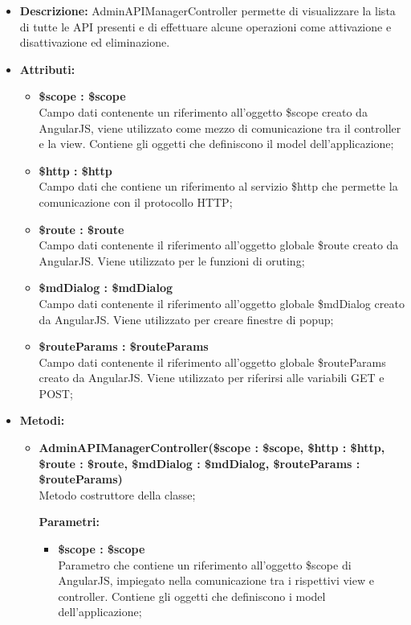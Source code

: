\begin{itemize}
	\item \textbf{Descrizione:} AdminAPIManagerController permette di visualizzare la lista di tutte le API presenti e di effettuare alcune operazioni come attivazione e disattivazione ed eliminazione.
	\item \textbf{Attributi:}
	\begin{itemize}
		
		\item \textbf{\$scope : \$scope}\\
		Campo dati contenente un riferimento all'oggetto \$scope creato da AngularJS, viene utilizzato come mezzo di comunicazione tra il controller e la view. Contiene gli oggetti che definiscono il model dell'applicazione;
		
		\item \textbf{\$http : \$http }\\
		Campo dati che contiene un riferimento al servizio \$http che permette la comunicazione con il protocollo HTTP;
		
		\item \textbf{\$route : \$route }\\
		Campo dati contenente il riferimento all'oggetto globale \$route creato da AngularJS. Viene utilizzato per le funzioni di oruting;
		
		\item \textbf{\$mdDialog : \$mdDialog }\\
		Campo dati contenente il riferimento all'oggetto globale \$mdDialog creato da AngularJS. Viene utilizzato per creare finestre di popup;
		
		\item \textbf{\$routeParams : \$routeParams }\\
		Campo dati contenente il riferimento all'oggetto globale \$routeParams creato da AngularJS. Viene utilizzato per riferirsi alle variabili GET e POST;
		
		
	\end{itemize}
	\item \textbf{Metodi:}
	\begin{itemize}
		
		\item \textbf{AdminAPIManagerController(\$scope : \$scope, \$http : \$http, \$route : \$route, \$mdDialog : \$mdDialog, \$routeParams : \$routeParams)}\\
		Metodo costruttore della classe;
		\begin{description}
			\item[\textbf{Parametri:}]
		\end{description}
		\begin{itemize}
			\item \textbf{\$scope : \$scope}\\
			Parametro che contiene un riferimento all'oggetto \$scope di AngularJS, impiegato nella comunicazione tra i rispettivi view e controller. Contiene gli oggetti che definiscono i model dell'applicazione;
			

\end{itemize}
\end{itemize}
\end{itemize}

